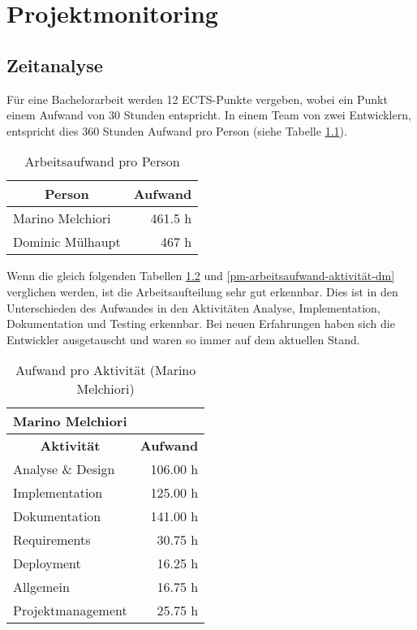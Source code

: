\chapter{Projektmonitoring}
\label{pm-projektmonitoring}

\section{Zeitanalyse}
Für eine Bachelorarbeit werden 12 ECTS-Punkte vergeben, wobei ein Punkt einem Aufwand von 30 Stunden entspricht.
In einem Team von zwei Entwicklern, entspricht dies 360 Stunden Aufwand pro Person (siehe Tabelle \ref{pm-arbeitsaufwand}).

\begin{table}[H]
\centering
\begin{tabular}{|l|r|}
\hline 
\multicolumn{1}{|c|}{\textbf{Person}} & \multicolumn{1}{|c|}{\textbf{Aufwand}} \\
\hline 
Marino Melchiori & 461.5 h \\
\hline 
Dominic Mülhaupt & 467 h \\  
\hline 
\end{tabular}
\caption{Arbeitsaufwand pro Person}
\label{pm-arbeitsaufwand}
\end{table}

Wenn die gleich folgenden Tabellen \ref{pm-arbeitsaufwand-aktivität-mm} und \ref{pm-arbeitsaufwand-aktivität-dm} verglichen werden, ist die Arbeitsaufteilung sehr gut erkennbar. 
Dies ist in den Unterschieden des Aufwandes in den Aktivitäten Analyse, Implementation, Dokumentation und Testing erkennbar. 
Bei neuen Erfahrungen haben sich die Entwickler ausgetauscht und waren so immer auf dem aktuellen Stand. 

\begin{table}[H]
\centering
\label{pm-arbeitsaufwand-aktivität-mm}
\begin{tabular}{|l|r|}
\hline
\multicolumn{2}{|l|}{\textbf{Marino Melchiori}} \\
\hline
\multicolumn{1}{|c|}{\textbf{Aktivität}} & \multicolumn{1}{|c|}{\textbf{Aufwand}} \\
\hline
Analyse \& Design & 106.00 h \\
\hline
Implementation & 125.00 h \\
\hline
Dokumentation & 141.00 h \\
\hline
Requirements & 30.75 h \\
\hline
Deployment & 16.25 h \\
\hline
Allgemein & 16.75 h \\
\hline
Projektmanagement & 25.75 h \\
\hline
\end{tabular}
\caption{Aufwand pro Aktivität (Marino Melchiori)}
\end{table}

